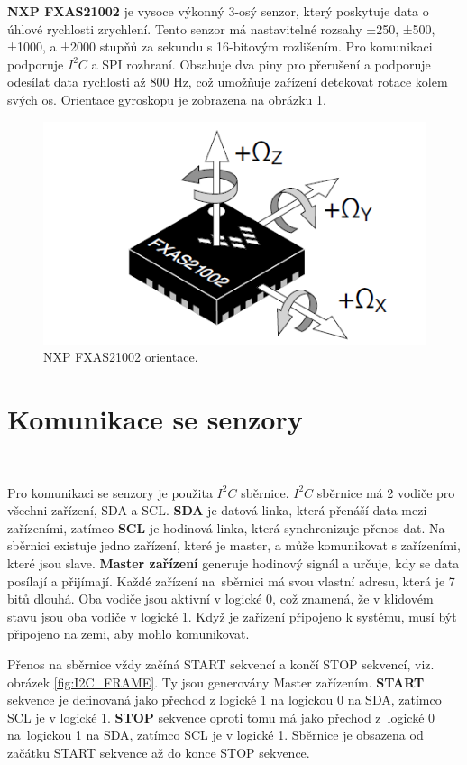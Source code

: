 \textbf{NXP FXAS21002} je vysoce výkonný 3-osý senzor, který poskytuje data o úhlové rychlosti
zrychlení. Tento senzor má nastavitelné rozsahy ±250, ±500, ±1000, a
±2000 stupňů za sekundu
s 16-bitovým rozlišením. Pro komunikaci podporuje $I^2C$ a SPI rozhraní.
Obsahuje dva piny pro přerušení a podporuje odesílat data rychlosti až 800 Hz, což umožňuje zařízení detekovat rotace kolem svých os.
Orientace gyroskopu je zobrazena na obrázku \ref{fig:FXAS_Orientation}\cite{FXAS21002}.

\begin{figure}[!h]
    \centering
    \includegraphics[width = 0.5\linewidth]{Figures/FXAS_Orientation.png}
    \caption{NXP FXAS21002 orientace\cite{FXAS21002}.}
    \label{fig:FXAS_Orientation}
\end{figure}

\section{Komunikace se senzory}\

Pro komunikaci se senzory je použita $I^2C$ sběrnice.
$I^2C$ sběrnice má 2 vodiče pro všechni zařízení, SDA a SCL.
\textbf{SDA} je datová linka, která
přenáší data mezi zařízeními, zatímco \textbf{SCL} je hodinová linka, která synchronizuje
přenos dat. Na sběrnici existuje jedno zařízení, které je master, a může komunikovat
s zařízeními, které jsou slave. \textbf{Master zařízení} generuje hodinový signál a
určuje, kdy se data posílají a přijímají. Každé zařízení na~sběrnici má svou
vlastní adresu, která je 7 bitů dlouhá. Oba vodiče jsou aktivní v logické 0, což znamená,
že v klidovém stavu jsou oba vodiče v logické 1. Když je zařízení připojeno k
systému, musí být připojeno na zemi, aby mohlo komunikovat.

Přenos na sběrnice vždy začíná START sekvencí a končí STOP sekvencí,
viz. obrázek \ref{fig:I2C_FRAME}. Ty jsou generovány Master zařízením.
\textbf{START} sekvence je definovaná jako přechod z logické 1 na logickou 0 na SDA, zatímco
SCL je v logické 1. \textbf{STOP} sekvence oproti tomu má jako přechod z~logické 0 na~logickou 1 na SDA, zatímco SCL je v logické 1. Sběrnice je obsazena od začátku START sekvence
až do konce STOP sekvence.

